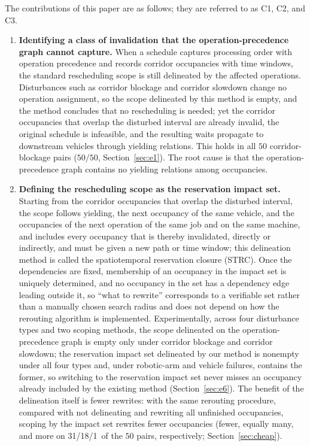 \documentclass[manuscript,screen,review]{acmart}
\providecommand{\STRC}{\textsc{STRC}}
\newcommand{\NPairs}{50}
\newcommand{\PassMiss}{\NPairs/\NPairs}      %
\newcommand{\RAStabWTL}{31/18/1}     %
\begin{document}
The contributions of this paper are as follows; they are referred to as C1, C2, and C3.

\begin{enumerate}[label=\textbf{C\arabic*.},leftmargin=2.2em,itemsep=0.4em]
\item \textbf{Identifying a class of invalidation that the operation-precedence graph cannot capture.}
When a schedule captures processing order with operation precedence and records corridor occupancies with time windows,
the standard rescheduling scope is still delineated by the affected operations.
Disturbances such as corridor blockage and corridor slowdown change no operation assignment,
so the scope delineated by this method is empty, and the method concludes that no rescheduling is needed;
yet the corridor occupancies that overlap the disturbed interval are already invalid, the original schedule is infeasible,
and the resulting waits propagate to downstream vehicles through yielding relations.
This holds in all \(\NPairs\) corridor-blockage pairs (\(\PassMiss\), Section~\ref{sec:e1}).
The root cause is that the operation-precedence graph contains no yielding relations among occupancies.

\item \textbf{Defining the rescheduling scope as the reservation impact set.}
Starting from the corridor occupancies that overlap the disturbed interval,
the scope follows yielding, the next occupancy of the same vehicle, and the occupancies of the next operation of the same job and on the same machine,
and includes every occupancy that is thereby invalidated, directly or indirectly, and must be given a new path or time window; this delineation method is called the spatiotemporal reservation closure (\STRC).
Once the dependencies are fixed, membership of an occupancy in the impact set is uniquely determined,
and no occupancy in the set has a dependency edge leading outside it, so ``what to rewrite'' corresponds to a verifiable set
rather than a manually chosen search radius and does not depend on how the rerouting algorithm is implemented.
Experimentally, across four disturbance types and two scoping methods, the scope delineated on the operation-precedence graph is empty only under corridor blockage and corridor slowdown;
the reservation impact set delineated by our method is nonempty under all four types and, under robotic-arm and vehicle failures, contains the former,
so switching to the reservation impact set never misses an occupancy already included by the existing method (Section~\ref{sec:e6}).
The benefit of the delineation itself is fewer rewrites: with the same rerouting procedure, compared with not delineating and rewriting all unfinished occupancies,
scoping by the impact set rewrites fewer occupancies (fewer, equally many, and more on \RAStabWTL\ of the \(\NPairs\) pairs, respectively; Section~\ref{sec:cheap}).


\end{enumerate}
\end{document}
